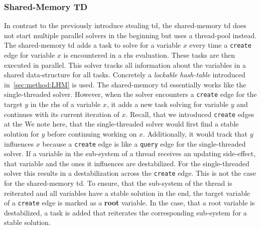     \subsubsection{Shared-Memory TD}
    \label{sec:method:td_parallel:sharedMem}
    In contrast to the previously introduce stealing \ac{td}, the shared-memory \ac{td} does not start multiple parallel solvers in the beginning but uses a thread-pool instead. The shared-memory \ac{td} adds a task to solve for a variable $x$ every time a \texttt{create} edge for variable $x$ is encountered in a \ac{rhs} evaluation. These tasks are then executed in parallel.
    This solver tracks all information about the variables in a shared data-structure for all tasks. Concretely a \textit{lockable hash-table} introduced in~\autoref{sec:method:LHM} is used.
    The shared-memory \ac{td} essentially works like the single-threaded solver. However, when the solver encounters a \texttt{create} edge for the target $y$ in the \ac{rhs} of a variable $x$, it adds a new task solving for variable $y$ and continues with its current iteration of $x$. Recall, that we introduced \texttt{create} edges at the  We note here, that the single-threaded solver would first find a stable solution for $y$ before continuing working on $x$. Additionally, it would track that $y$ influences $x$ because a \texttt{create} edge is like a \texttt{query} edge for the single-threaded solver. If a variable in the sub-system of a thread receives an updating side-effect, that variable and the ones it influences are destabilized. For the single-threaded solver this results in a destabilization across the \texttt{create} edge. This is not the case for the shared-memory \ac{td}. To ensure, that the sub-system of the thread is reiterated and all variables have a stable solution in the end, the target variable of a \texttt{create} edge is marked as a \textbf{root} variable. In the case, that a root variable is destabilized, a task is added that reiterates the corresponding sub-system for a stable solution.

